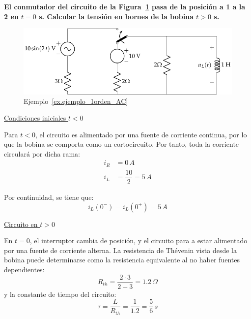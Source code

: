 	\begin{example}\label{ex.ejemplo_1orden_AC}
	
	\textbf{El conmutador del circuito de la Figura~\ref{fig.ej_transitorio_1orden_AC} pasa de la posición a 1 a la 2 en $t = 0$ s. Calcular la tensión en bornes de la bobina $t > 0$ s.}
	
	\begin{figure}[H]
	    \centering
	    \includegraphics{../figs/ej_transitorio_1orden_AC.pdf}
	    \caption{Ejemplo~\ref{ex.ejemplo_1orden_AC}}
	    \label{fig.ej_transitorio_1orden_AC}
	\end{figure}
	    
	\underline{Condiciones iniciales $t<0$}
	
    Para $t<0$, el circuito es alimentado por una fuente de corriente continua, por lo que la bobina se comporta como un cortocircuito. Por tanto, toda la corriente circulará por dicha rama:
    \begin{align*}
        i_R&=0 \,A\\
        i_L&=\dfrac{10}{2}=5\,A
    \end{align*}
    
    Por continuidad, se tiene que:
    \begin{equation*}
        i_L(0^-)=i_L(0^+)=5\,A
    \end{equation*}
	
	\underline{Circuito en $t>0$}
	
	En $t=0$, el interruptor cambia de posición, y el circuito para a estar alimentado por una fuente de corriente alterna. La resistencia de Thévenin vista desde la bobina puede determinarse como la resistencia equivalente al no haber fuentes dependientes:
	\begin{equation*}
	    R_{th}=\dfrac{2\cdot 3}{2+3}=1.2\,\Omega
	\end{equation*}
	y la constante de tiempo del circuito:
	\begin{equation*}
	    \tau=\dfrac{L}{R_{th}}=\dfrac{1}{1.2}=\dfrac{5}{6}\,s
	\end{equation*}
	

\end{example}
